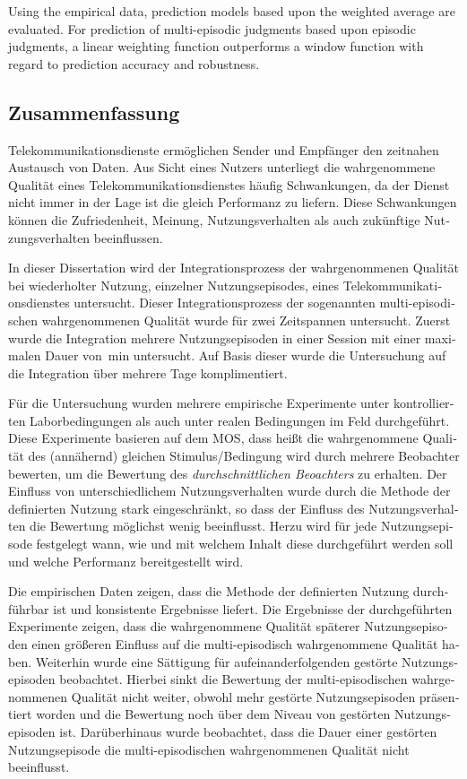 Using the empirical data, prediction models based upon the weighted average are evaluated.
For prediction of multi-episodic judgments based upon episodic judgments, a linear weighting function outperforms a window function with regard to prediction accuracy and robustness.

\begin{otherlanguage}{ngerman}
\chapter*{Zusammenfassung}
Telekommunikationsdienste ermöglichen Sender und Empfänger den zeitnahen Austausch von Daten.
Aus Sicht eines Nutzers unterliegt die wahrgenommene Qualität eines Telekommunikationsdienstes häufig Schwankungen, da der Dienst nicht immer in der Lage ist die gleich Performanz zu liefern.
Diese Schwankungen können die Zufriedenheit, Meinung, Nutzungsverhalten als auch zukünftige Nutzungsverhalten beeinflussen.

In dieser Dissertation wird der Integrationsprozess der wahrgenommenen Qualität bei wiederholter Nutzung, einzelner Nutzungsepisodes, eines Telekommunikationsdienstes untersucht.
Dieser Integrationsprozess der sogenannten multi-episodischen wahrgenommenen Qualität wurde für zwei Zeitspannen untersucht.
Zuerst wurde die Integration mehrere Nutzungsepisoden in einer Session mit einer maximalen Dauer von~\unit[45]{min} untersucht.
Auf Basis dieser wurde die Untersuchung auf die Integration über mehrere Tage komplimentiert.

Für die Untersuchung wurden mehrere empirische Experimente unter kontrollierten Laborbedingungen als auch unter realen Bedingungen im Feld durchgeführt.
Diese Experimente basieren auf dem \acs{MOS}, dass heißt die wahrgenommene Qualität des (annähernd) gleichen Stimulus/Bedingung wird durch mehrere Beobachter bewerten, um die Bewertung des \emph{durchschnittlichen Beoachters} zu erhalten.
Der Einfluss von unterschiedlichem Nutzungsverhalten wurde durch die Methode der definierten Nutzung stark eingeschränkt, so dass der Einfluss des Nutzungsverhalten die Bewertung möglichst wenig beeinflusst.
Herzu wird für jede Nutzungsepisode festgelegt wann, wie und mit welchem Inhalt diese durchgeführt werden soll und welche Performanz bereitgestellt wird.

Die empirischen Daten zeigen, dass die Methode der definierten Nutzung durchführbar ist und konsistente Ergebnisse liefert.
Die Ergebnisse der durchgeführten Experimente zeigen, dass die wahrgenommene Qualität späterer Nutzungsepisoden einen größeren Einfluss auf die multi-episodisch wahrgenommene Qualität haben.
Weiterhin wurde eine Sättigung für aufeinanderfolgenden gestörte Nutzungsepisoden beobachtet.
Hierbei sinkt die Bewertung der multi-episodischen wahrgenommenen Qualität nicht weiter, obwohl mehr gestörte Nutzungsepisoden präsentiert worden und die Bewertung noch über dem Niveau von gestörten Nutzungsepisoden ist.
Darüberhinaus wurde beobachtet, dass die Dauer einer gestörten Nutzungsepisode die multi-episodischen wahrgenommenen Qualität nicht beeinflusst.


\end{otherlanguage}
